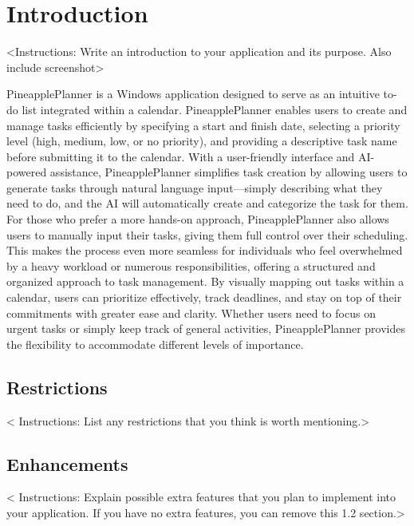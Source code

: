 \documentclass{article}
\begin{document}
\newpage

\tableofcontents
\thispagestyle{empty}

\newpage
\listoffigures
\lstlistoflistings
\listoftables

\newpage

\section{Introduction}
<Instructions: Write an introduction to your application and its purpose. Also include screenshot>

PineapplePlanner is a Windows application designed to serve as an intuitive to-do list integrated within a calendar.
PineapplePlanner enables users to create and manage tasks efficiently by specifying a start and finish date, selecting a priority level (high, medium, low, or no priority), and providing a descriptive task name before submitting it to the calendar.
With a user-friendly interface and AI-powered assistance, PineapplePlanner simplifies task creation by allowing users to generate tasks through natural language input—simply describing what they need to do, and the AI will automatically create and categorize the task for them.
For those who prefer a more hands-on approach, PineapplePlanner also allows users to manually input their tasks, giving them full control over their scheduling.
This makes the process even more seamless for individuals who feel overwhelmed by a heavy workload or numerous responsibilities, offering a structured and organized approach to task management.
By visually mapping out tasks within a calendar, users can prioritize effectively, track deadlines, and stay on top of their commitments with greater ease and clarity.
Whether users need to focus on urgent tasks or simply keep track of general activities, PineapplePlanner provides the flexibility to accommodate different levels of importance.

\subsection{Restrictions}
< Instructions: List any restrictions that you think is worth mentioning.>

\subsection{Enhancements}
< Instructions: Explain possible extra features that you plan to implement into your application. If you have no extra features, you can remove this 1.2 section.>
\end{document}
